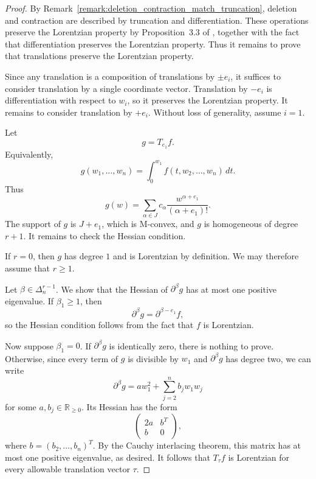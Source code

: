 \documentclass[11pt]{article}
\theoremstyle{definition}
\theoremstyle{remark}
\newcommand{\R}{\mathbb{R}}
\begin{document}
\begin{proof}
    By Remark~\ref{remark:deletion_contraction_match_truncation}, deletion and contraction are described by truncation and differentiation. These operations preserve the Lorentzian property by Proposition~3.3 of \cite{ross2023duallylorentzianpolynomials}, together with the fact that differentiation preserves the Lorentzian property. Thus it remains to prove that translations preserve the Lorentzian property.

    Since any translation is a composition of translations by $\pm e_i$, it suffices to consider translation by a single coordinate vector. Translation by $-e_i$ is differentiation with respect to $w_i$, so it preserves the Lorentzian property. It remains to consider translation by $+e_i$. Without loss of generality, assume $i=1$.

    Let
    \[
        g=T_{e_1}f.
    \]
    Equivalently,
    \[
        g(w_1,\dots,w_n)
        =
        \int_0^{w_1} f(t,w_2,\dots,w_n)\,dt.
    \]
    Thus
    \[
        g(w)
        =
        \sum_{\alpha\in J}
        c_\alpha
        \frac{w^{\alpha+e_1}}{(\alpha+e_1)!}.
    \]
    The support of $g$ is $J+e_1$, which is M-convex, and $g$ is homogeneous of degree $r+1$. It remains to check the Hessian condition.

    If $r=0$, then $g$ has degree $1$ and is Lorentzian by definition.
    We may therefore assume that $r\geq 1$.

    Let $\beta\in\Delta_n^{r-1}$. We show that the Hessian of $\partial^\beta g$ has at most one positive eigenvalue. If $\beta_1\geq 1$, then
    \[
        \partial^\beta g
        =
        \partial^{\beta-e_1} f,
    \]
    so the Hessian condition follows from the fact that $f$ is Lorentzian.

    Now suppose $\beta_1=0$. If $\partial^\beta g$ is identically zero, there is nothing to prove. Otherwise, since every term of $g$ is divisible by $w_1$ and $\partial^\beta g$ has degree two, we can write
    \[
        \partial^\beta g
        =
        a w_1^2+\sum_{j=2}^n b_j w_1w_j
    \]
    for some $a,b_j\in\R_{\geq 0}$. Its Hessian has the form
\[
    \begin{pmatrix}
        2a & b^T \\
        b & 0
    \end{pmatrix},
\]
where $b=(b_2,\dots,b_n)^T$. By the Cauchy interlacing theorem, this matrix has at most one positive eigenvalue, as desired. It follows that $T_\tau f$ is Lorentzian for every allowable translation vector $\tau$.
\end{proof}
\end{document}
